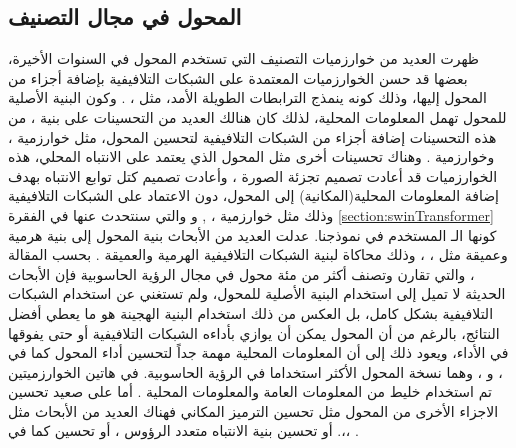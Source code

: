 \subsection{المحول في مجال التصنيف}
ظهرت العديد من خوارزميات التصنيف التي تستخدم المحول في السنوات الأخيرة، بعضها قد حسن الخوارزميات المعتمدة على الشبكات التلافيفية بإضافة أجزاء من المحول إليها، وذلك كونه ينمذج الترابطات الطويلة الأمد، مثل
،
.
وكون البنية الأصلية للمحول 
تهمل المعلومات المحلية، لذلك كان هنالك العديد من التحسينات على بنية
،
من هذه التحسينات إضافة أجزاء من الشبكات التلافيفية لتحسين المحول، مثل خوارزمية
،
وخوارزمية 
.
\newline
وهناك تحسينات أخرى مثل المحول الذي يعتمد على الانتباه المحلي،
هذه الخوارزميات قد أعادت تصميم تجزئة الصورة 
،
وأعادت تصميم كتل توابع الانتباه بهدف إضافة المعلومات المحلية(المكانية) إلى المحول، دون الاعتماد على الشبكات التلافيفية وذلك مثل خوارزمية 
،
,
و 
والتي سنتحدث عنها في الفقرة
\ref{section:swinTransformer}
كونها الـ
المستخدم في نموذجنا.
\newline
عدلت العديد من الأبحاث بنية المحول  إلى بنية هرمية وعميقة مثل
،
،
وذلك محاكاة لبنية الشبكات التلافيفية الهرمية والعميقة 
.
\newline
بحسب المقالة
،
والتي تقارن وتصنف أكثر من مئة محول في مجال الرؤية الحاسوبية فإن الأبحاث الحديثة لا تميل إلى استخدام البنية الأصلية للمحول، ولم تستغني عن استخدام الشبكات التلافيفية بشكل كامل، بل العكس من ذلك استخدام البنية الهجينة هو ما يعطي أفضل النتائج، بالرغم من أن المحول يمكن أن يوازي بأداءه الشبكات التلافيفية أو حتى يفوقها في الأداء، ويعود ذلك إلى أن المعلومات المحلية مهمة جداً لتحسين أداء المحول كما في 
،
و
،
وهما نسخة المحول الأكثر استخداما في الرؤية الحاسوبية.
في هاتين الخوارزميتين تم استخدام خليط من المعلومات العامة 
والمعلومات المحلية 
.
\newline
أما على صعيد تحسين الاجزاء الأخرى من المحول مثل تحسين الترميز المكاني
فهناك العديد من الأبحاث مثل
،،. 
أو تحسين بنية
الانتباه متعدد الرؤوس
،
أو تحسين 
كما في 
.
